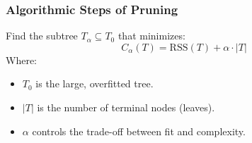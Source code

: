 \subsubsection{Algorithmic Steps of Pruning}

Find the subtree $T_\alpha \subseteq T_0$ that minimizes:
\begin{equation*}
    C_\alpha(T) = \text{RSS}(T) + \alpha \cdot \left|T\right|
\end{equation*}
Where:
\begin{itemize}
    \item $T_0$ is the large, overfitted tree.
    \item $|T|$ is the number of terminal nodes (leaves).
    \item $\alpha$ controls the trade-off between fit and complexity.
\end{itemize}

